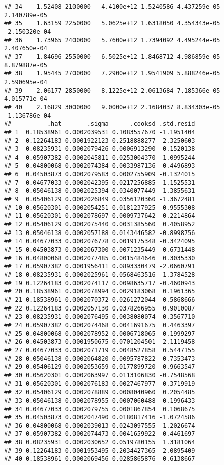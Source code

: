 \documentclass[]{book}
\theoremstyle{definition}
\theoremstyle{definition}
\theoremstyle{definition}
\theoremstyle{remark}
\begin{document}
\begin{verbatim}
## 34    1.52408 2100000   4.4100e+12 1.5240586 4.437259e-05  2.140789e-05
## 35    1.63159 2250000   5.0625e+12 1.6318050 4.354343e-05 -2.150320e-04
## 36    1.73965 2400000   5.7600e+12 1.7394092 4.495244e-05  2.407650e-04
## 37    1.84696 2550000   6.5025e+12 1.8468712 4.986859e-05  8.879887e-05
## 38    1.95445 2700000   7.2900e+12 1.9541909 5.888246e-05  2.590695e-04
## 39    2.06177 2850000   8.1225e+12 2.0613684 7.185366e-05  4.015771e-04
## 40    2.16829 3000000   9.0000e+12 2.1684037 8.834303e-05 -1.136786e-04
##          .hat       .sigma      .cooksd .std.resid
## 1  0.18538961 0.0002039531 0.1083557670 -1.1951404
## 2  0.12264183 0.0001922123 0.2518888277 -2.3250603
## 3  0.08235931 0.0002079426 0.0006913290  0.1520138
## 4  0.05907382 0.0002045811 0.0253004370  1.0995244
## 5  0.04800068 0.0002074384 0.0033987136  0.4496893
## 6  0.04503873 0.0002079583 0.0002755909 -0.1324015
## 7  0.04677033 0.0002042395 0.0217256885 -1.1525531
## 8  0.05046138 0.0002025394 0.0340077449  1.3855631
## 9  0.05406129 0.0002026849 0.0356120360 -1.3672481
## 10 0.05620301 0.0002054251 0.0181237925 -0.9555308
## 11 0.05620301 0.0002078697 0.0009737642  0.2214864
## 12 0.05406129 0.0002075440 0.0031385560  0.4058952
## 13 0.05046138 0.0002057188 0.0143446582 -0.8998756
## 14 0.04677033 0.0002076778 0.0019175348 -0.3424095
## 15 0.04503873 0.0002067300 0.0071235449  0.6731448
## 16 0.04800068 0.0002077485 0.0015484646  0.3035330
## 17 0.05907382 0.0001956411 0.0893330479 -2.0660791
## 18 0.08235931 0.0002025961 0.0568463516 -1.3784528
## 19 0.12264183 0.0002074117 0.0098635717 -0.4600943
## 20 0.18538961 0.0002078994 0.0029183068  0.1961365
## 21 0.18538961 0.0002070372 0.0261272044  0.5868666
## 22 0.12264183 0.0002057130 0.0378266955  0.9010087
## 23 0.08235931 0.0002076495 0.0038080074 -0.3567710
## 24 0.05907382 0.0002074468 0.0041691675  0.4463397
## 25 0.04800068 0.0002078952 0.0006718065  0.1999297
## 26 0.04503873 0.0001950675 0.0701204501  2.1119458
## 27 0.04677033 0.0002071719 0.0048527858  0.5447155
## 28 0.05046138 0.0002064820 0.0095787822  0.7353473
## 29 0.05406129 0.0002053659 0.0177899720 -0.9663547
## 30 0.05620301 0.0002063997 0.0113106830 -0.7548568
## 31 0.05620301 0.0002076183 0.0027467977  0.3719919
## 32 0.05406129 0.0002078889 0.0008040960  0.2054485
## 33 0.05046138 0.0002078955 0.0007060488 -0.1996433
## 34 0.04677033 0.0002079755 0.0001867854  0.1068675
## 35 0.04503873 0.0002047490 0.0180817416 -1.0724586
## 36 0.04800068 0.0002039013 0.0243097555  1.2026674
## 37 0.05907382 0.0002074473 0.0041659922  0.4461697
## 38 0.08235931 0.0002030652 0.0519780155  1.3181064
## 39 0.12264183 0.0001953495 0.2034427365  2.0895409
## 40 0.18538961 0.0002069456 0.0285865876 -0.6138667
\end{verbatim}
\end{document}
